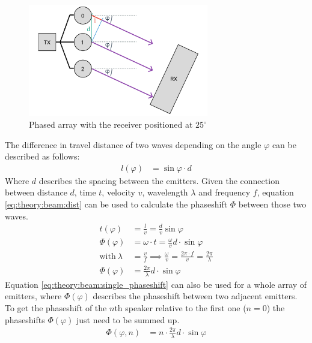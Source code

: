 \begin{figure}
  \centering
  \includegraphics[width=0.7\textwidth]{src/assets/pictures/theory/angle_array.png}
  \caption{Phased array with the receiver positioned at $25^\circ$}\label{fig:theory:beam:array_angle}
\end{figure}
\p
The difference in travel distance of two waves depending on the angle \(\varphi\) can be described as follows:
%
\begin{align}
  l(\varphi) &= \sin \varphi \cdot d\label{eq:theory:beam:dist}
\end{align}
%
Where \(d\) describes the spacing between the emitters.\newpage
%
\noindent Given the connection between distance $d$, time $t$, velocity $v$, wavelength $\lambda$ and frequency $f$, equation \ref{eq:theory:beam:dist} can be used to calculate the phaseshift $\Phi$ between those two waves.\cite{elert_speed_2021}\cite{cassidy_understanding_2002}
%
\begin{align}
  t(\varphi)     &= \frac{l}{v} = \frac{d}{v} \sin \varphi \\[1em]
  \Phi(\varphi)  &= \omega \cdot t = \frac{\omega}{v} d \cdot \sin \varphi \\[1em]
  \mathrm{with~} \lambda &= \frac{v}{f} \implies \frac{\omega}{v} = \frac{2\pi \cdot f}{v} = \frac{2\pi}{\lambda} \\[1em]
  \Phi(\varphi)  &= \frac{2\pi}{\lambda} d \cdot \sin \varphi \label{eq:theory:beam:single_phaseshift}
\end{align}
%
Equation \ref{eq:theory:beam:single_phaseshift} can also be used for a whole array of emitters, where $\Phi(\varphi)$ describes the phaseshift between two adjacent emitters. To get the phaseshift of the $n$th speaker relative to the first one ($n=0$) the phaseshifts $\Phi(\varphi)$ just need to be summed up.
%
\begin{align}
  \Phi(\varphi, n) &= n \cdot \frac{2\pi}{\lambda} d \cdot \sin \varphi
\end{align}
